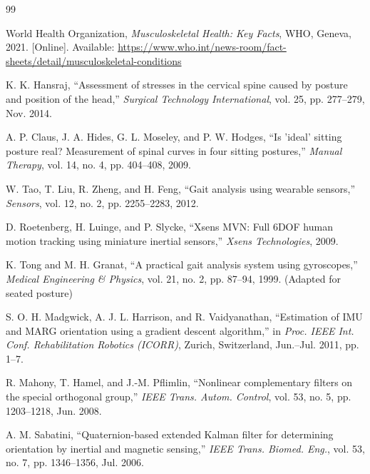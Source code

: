 \documentclass[12pt,a4paper]{report}
\begin{document}
\begin{thebibliography}{99}

World Health Organization, \textit{Musculoskeletal Health: Key Facts}, WHO, Geneva, 2021. [Online]. Available: \url{https://www.who.int/news-room/fact-sheets/detail/musculoskeletal-conditions}

K. K. Hansraj, ``Assessment of stresses in the cervical spine caused by posture and position of the head,'' \textit{Surgical Technology International}, vol. 25, pp. 277--279, Nov. 2014.

A. P. Claus, J. A. Hides, G. L. Moseley, and P. W. Hodges, ``Is 'ideal' sitting posture real? Measurement of spinal curves in four sitting postures,'' \textit{Manual Therapy}, vol. 14, no. 4, pp. 404--408, 2009.

W. Tao, T. Liu, R. Zheng, and H. Feng, ``Gait analysis using wearable sensors,'' \textit{Sensors}, vol. 12, no. 2, pp. 2255--2283, 2012.

D. Roetenberg, H. Luinge, and P. Slycke, ``Xsens MVN: Full 6DOF human motion tracking using miniature inertial sensors,'' \textit{Xsens Technologies}, 2009.

K. Tong and M. H. Granat, ``A practical gait analysis system using gyroscopes,'' \textit{Medical Engineering \& Physics}, vol. 21, no. 2, pp. 87--94, 1999. (Adapted for seated posture)

S. O. H. Madgwick, A. J. L. Harrison, and R. Vaidyanathan, ``Estimation of IMU and MARG orientation using a gradient descent algorithm,'' in \textit{Proc. IEEE Int. Conf. Rehabilitation Robotics (ICORR)}, Zurich, Switzerland, Jun.--Jul. 2011, pp. 1--7.

R. Mahony, T. Hamel, and J.-M. Pflimlin, ``Nonlinear complementary filters on the special orthogonal group,'' \textit{IEEE Trans. Autom. Control}, vol. 53, no. 5, pp. 1203--1218, Jun. 2008.

A. M. Sabatini, ``Quaternion-based extended Kalman filter for determining orientation by inertial and magnetic sensing,'' \textit{IEEE Trans. Biomed. Eng.}, vol. 53, no. 7, pp. 1346--1356, Jul. 2006.


\end{thebibliography}
\end{document}
